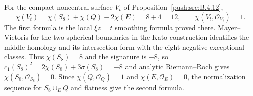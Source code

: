 \begin{remark}
\hypertarget{tag-PT14}{}\label{I:quadric-parabolic-euler}
For the compact noncentral surface $V_t$ of Proposition~\ref{push:src:B.4.12},
\[
 \chi(V_t)=\chi(S_8)+\chi(Q)-2\chi(E)=8+4=12,
 \qquad \chi(V_t,\mathcal O_{V_t})=1.
\]
The first formula is the local $\xi z=t$ smoothing formula proved there. Mayer--Vietoris for the two spherical boundaries in the Kato construction identifies the middle homology and its intersection form with the eight negative exceptional classes. Thus $\chi(S_8)=8$ and the signature is $-8$, so $c_1(S_8)^2=2\chi(S_8)+3\sigma(S_8)=-8$ and analytic Riemann--Roch gives $\chi(S_8,\mathcal O_{S_8})=0$. Since $\chi(Q,\mathcal O_Q)=1$ and $\chi(E,\mathcal O_E)=0$, the normalization sequence for $S_8\cup_E Q$ and flatness give the second formula.
\end{remark}
